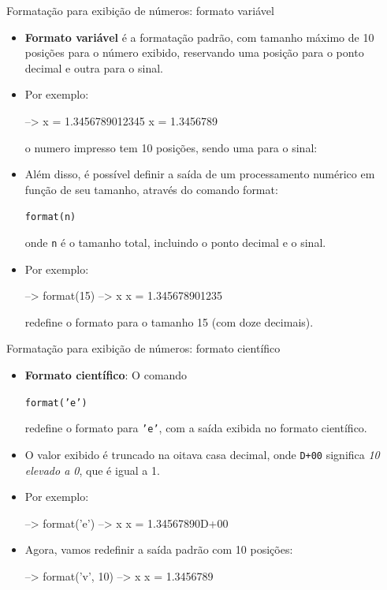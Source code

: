 \begin{frame}{Formatação para exibição de números: formato variável}
  \begin{itemize}
    \item \textbf{Formato variável} é a formatação padrão, com tamanho
    máximo de 10 posições para o número exibido, reservando uma posição
    para o ponto decimal e outra para o sinal.

    \item Por exemplo:
    \begin{pygmented}[]
--> x = 1.3456789012345
 x  =
      1.3456789
    \end{pygmented}
    o numero impresso tem 10 posições, sendo uma para o sinal:

    \framebreak

    \item Além disso, é possível definir a saída de um processamento
    numérico em função de seu tamanho, através do comando
    \alert{format}:
    \begin{center}
      \texttt{format(n)}
    \end{center}
    onde \texttt{n} é o tamanho total, incluindo o ponto decimal e o
    sinal.

    \item Por exemplo:
    \begin{pygmented}[]
--> format(15)
--> x
 x  =
      1.345678901235
    \end{pygmented}
    redefine o formato para o tamanho 15 (com doze decimais).
  \end{itemize}
\end{frame}

\begin{frame}{Formatação para exibição de números: formato científico}
  \begin{itemize}
    \item \textbf{Formato científico}: O comando
    \begin{center}
      \texttt{format('e')}
    \end{center}
    redefine o formato para \texttt{'e'}, com a saída exibida no formato
    científico.

    \item O valor exibido é truncado na oitava casa decimal, onde
    \texttt{D+00} significa \emph{10 elevado a 0}, que é igual a 1.

    \item Por exemplo:
    \begin{pygmented}[]
--> format('e')
--> x
 x  =
     1.34567890D+00
    \end{pygmented}

    \item Agora, vamos redefinir a saída padrão com 10 posições:
    \begin{pygmented}[]
--> format('v', 10)
--> x
 x  =
     1.3456789
    \end{pygmented}
  \end{itemize}
\end{frame}

